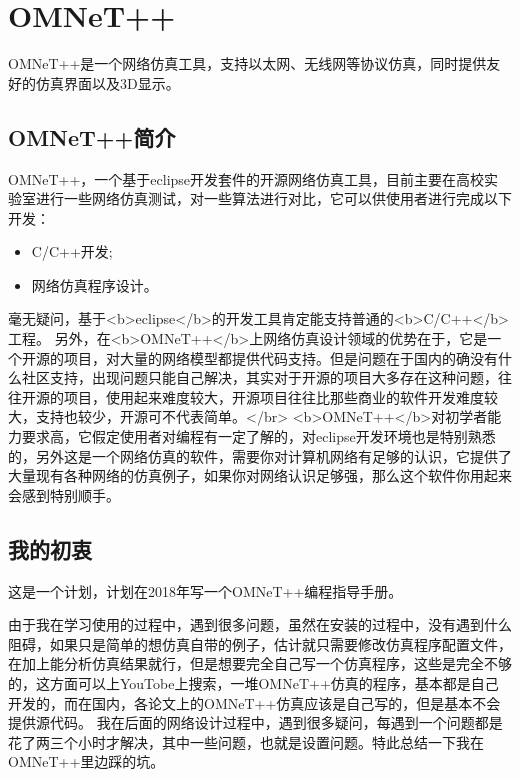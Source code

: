 \chapter{OMNeT++}

\begin{summary}
OMNeT++是一个网络仿真工具，支持以太网、无线网等协议仿真，同时提供友好的仿真界面以及3D显示。
\\
\end{summary}

\section{OMNeT++简介}

OMNeT++，一个基于eclipse开发套件的开源网络仿真工具，目前主要在高校实验室进行一些网络仿真测试，对一些算法进行对比，它可以供使用者进行完成以下开发：
\begin{itemize}
\item C/C++开发;
\item 网络仿真程序设计。
\end{itemize}
毫无疑问，基于<b>eclipse</b>的开发工具肯定能支持普通的<b>C/C++</b>工程。
另外，在<b>OMNeT++</b>上网络仿真设计领域的优势在于，它是一个开源的项目，对大量的网络模型都提供代码支持。但是问题在于国内的确没有什么社区支持，出现问题只能自己解决，其实对于开源的项目大多存在这种问题，往往开源的项目，使用起来难度较大，开源项目往往比那些商业的软件开发难度较大，支持也较少，开源可不代表简单。</br>
<b>OMNeT++</b>对初学者能力要求高，它假定使用者对编程有一定了解的，对eclipse开发环境也是特别熟悉的，另外这是一个网络仿真的软件，需要你对计算机网络有足够的认识，它提供了大量现有各种网络的仿真例子，如果你对网络认识足够强，那么这个软件你用起来会感到特别顺手。
\\
\section{我的初衷}

这是一个计划，计划在2018年写一个OMNeT++编程指导手册。

\begin{definition}
  由于我在学习使用的过程中，遇到很多问题，虽然在安装的过程中，没有遇到什么阻碍，如果只是简单的想仿真自带的例子，估计就只需要修改仿真程序配置文件，在加上能分析仿真结果就行，但是想要完全自己写一个仿真程序，这些是完全不够的，这方面可以上YouTobe上搜索，一堆OMNeT++仿真的程序，基本都是自己开发的，而在国内，各论文上的OMNeT++仿真应该是自己写的，但是基本不会提供源代码。\newline
  我在后面的网络设计过程中，遇到很多疑问，每遇到一个问题都是花了两三个小时才解决，其中一些问题，也就是设置问题。特此总结一下我在OMNeT++里边踩的坑。
\end{definition}

